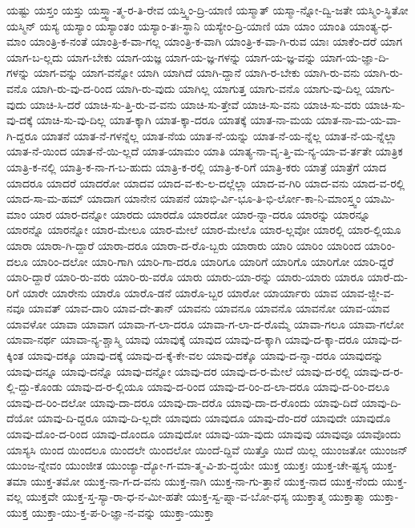{ಯಷ್ಟು
ಯಸ್ತಂ
ಯಸ್ತು
ಯಸ್ತ್ವಾ-ತ್ಮ-ರ-ತಿ-ರೇವ
ಯಸ್ತ್ವಿಂ-ದ್ರಿ-ಯಾಣಿ
ಯಸ್ಮಾತ್
ಯಸ್ಮಾ-ನ್ನೋ-ದ್ವಿ-ಜತೇ
ಯಸ್ಮಿಂ-ಸ್ಥಿತೋ
ಯಸ್ಮಿನ್
ಯಸ್ಯ
ಯಸ್ಯಾಂ
ಯಸ್ಯಾಂತಂ
ಯಸ್ಯಾಂ-ತಃ-ಸ್ಥಾನಿ
ಯಸ್ಯೇಂ-ದ್ರಿ-ಯಾಣಿ
ಯಾ
ಯಾಂ
ಯಾಂತಿ
ಯಾಂತ್ಯ-ಧ-ಮಾಂ
ಯಾಂತ್ರಿ-ಕ-ನಂತೆ
ಯಾಂತ್ರಿ-ಕ-ವಾ-ಗಲ್ಲ
ಯಾಂತ್ರಿ-ಕ-ವಾಗಿ
ಯಾಂತ್ರಿ-ಕ-ವಾ-ಗಿ-ರುವ
ಯಾಃ
ಯಾಕೆಂ-ದರೆ
ಯಾಗ
ಯಾಗ-ಬ-ಲ್ಲದು
ಯಾಗ-ಬೇಕು
ಯಾಗ-ಯಜ್ಞ
ಯಾಗ-ಯ-ಜ್ಞ-ಗಳನ್ನು
ಯಾಗ-ಯ-ಜ್ಞ-ವನ್ನು
ಯಾಗ-ಯ-ಜ್ಞಾ-ದಿ-ಗಳನ್ನು
ಯಾಗ-ವನ್ನು
ಯಾಗ-ವನ್ನೋ
ಯಾಗಿ
ಯಾಗಿದೆ
ಯಾಗಿ-ದ್ದಾನೆ
ಯಾಗಿ-ರ-ಬೇಕು
ಯಾಗಿ-ರು-ವನು
ಯಾಗಿ-ರು-ವನೊ
ಯಾಗಿ-ರು-ವು-ದ-ರಿಂದ
ಯಾಗಿ-ರು-ವುದು
ಯಾಗಿಲ್ಲ
ಯಾಗುತ್ತ
ಯಾಗು-ವನೊ
ಯಾಗು-ವು-ದಿಲ್ಲ
ಯಾಗು-ವುದು
ಯಾಚಿ-ಸಿ-ದರೆ
ಯಾಚಿ-ಸು-ತ್ತಿ-ರು-ವ-ವನು
ಯಾಚಿ-ಸು-ತ್ತೇವೆ
ಯಾಚಿ-ಸು-ವನು
ಯಾಚಿ-ಸು-ವರು
ಯಾಚಿ-ಸು-ವು-ದಕ್ಕೆ
ಯಾಚಿ-ಸು-ವು-ದಿಲ್ಲ
ಯಾತ-ಕ್ಕಾಗಿ
ಯಾತ-ಕ್ಕಾ-ದರೂ
ಯಾತಕ್ಕೆ
ಯಾತ-ನಾ-ಮಯ
ಯಾತ-ನಾ-ಮ-ಯ-ವಾ-ಗಿ-ದ್ದರೂ
ಯಾತನೆ
ಯಾತ-ನೆ-ಗಳನ್ನೆಲ್ಲ
ಯಾತ-ನೆಯ
ಯಾತ-ನೆ-ಯನ್ನು
ಯಾತ-ನೆ-ಯ-ನ್ನೆಲ್ಲ
ಯಾತ-ನೆ-ಯ-ನ್ನೆಲ್ಲಾ
ಯಾತ-ನೆ-ಯಿಂದ
ಯಾತ-ನೆ-ಯಿ-ಲ್ಲದೆ
ಯಾತ-ಯಾಮಂ
ಯಾತಿ
ಯಾತ್ಯ-ನಾ-ವೃ-ತ್ತಿ-ಮ-ನ್ಯ-ಯಾ-ವ-ರ್ತತೇ
ಯಾತ್ರಿಕ
ಯಾತ್ರಿ-ಕ-ನಲ್ಲಿ
ಯಾತ್ರಿ-ಕ-ನಾ-ಗ-ಬ-ಹುದು
ಯಾತ್ರಿ-ಕ-ರಲ್ಲಿ
ಯಾತ್ರಿ-ಕ-ರಿಗೆ
ಯಾತ್ರಿ-ಕರು
ಯಾತ್ರೆ
ಯಾತ್ರೆಗೆ
ಯಾದ
ಯಾದರೂ
ಯಾದರೆ
ಯಾದರೋ
ಯಾದವ
ಯಾದ-ವ-ಕು-ಲ-ದಲ್ಲೆಲ್ಲಾ
ಯಾದ-ವ-ಗಿರಿ
ಯಾದ-ವನು
ಯಾದ-ವ-ರಲ್ಲಿ
ಯಾದ-ಸಾ-ಮ-ಹಮ್
ಯಾದಾಗ
ಯಾನೇನ
ಯಾಪನೆ
ಯಾಭಿ-ರ್ವಿ-ಭೂ-ತಿ-ಭಿ-ರ್ಲೋ-ಕಾ-ನಿ-ಮಾಂಸ್ತ್ವಂ
ಯಾಮಿ-ಮಾಂ
ಯಾರ
ಯಾರ-ದನ್ನೋ
ಯಾರದು
ಯಾರದೊ
ಯಾರದೋ
ಯಾರ-ನ್ನಾ-ದರೂ
ಯಾರನ್ನು
ಯಾರನ್ನೂ
ಯಾರನ್ನೊ
ಯಾರನ್ನೋ
ಯಾರ-ಮೇಲೂ
ಯಾರ-ಮೇಲೆ
ಯಾರ-ಮೇಲೊ
ಯಾರ-ಲ್ಲವೋ
ಯಾರಲ್ಲಿ
ಯಾರ-ಲ್ಲಿಯೂ
ಯಾರಾ
ಯಾರಾ-ಗಿ-ದ್ದಾರೆ
ಯಾರಾ-ದರೂ
ಯಾರಾ-ದ-ರೊ-ಬ್ಬರು
ಯಾರಾರು
ಯಾರಿ
ಯಾರಿಂ
ಯಾರಿಂದ
ಯಾರಿಂ-ದಲೂ
ಯಾರಿಂ-ದಲೋ
ಯಾರಿ-ಗಾಗಿ
ಯಾರಿ-ಗಾ-ದರೂ
ಯಾರಿಗೂ
ಯಾರಿಗೆ
ಯಾರಿಗೊ
ಯಾರಿಗೋ
ಯಾರಿ-ದ್ದರೆ
ಯಾರಿ-ದ್ದಾರೆ
ಯಾರಿ-ರು-ವರು
ಯಾರಿ-ರು-ವರೊ
ಯಾರು
ಯಾರು-ಯಾ-ರನ್ನು
ಯಾರು-ಯಾರು
ಯಾರೂ
ಯಾರೆ-ದು-ರಿಗೆ
ಯಾರೇ
ಯಾರೇನು
ಯಾರೊ
ಯಾರೊ-ಡನೆ
ಯಾರೊ-ಬ್ಬರ
ಯಾರೋ
ಯಾರ್ಯಾರು
ಯಾವ
ಯಾವ-ಜ್ಜೀ-ವ-ನವೂ
ಯಾವತ್
ಯಾವ-ದಾರಿ
ಯಾವ-ದೇ-ತಾನ್
ಯಾವನು
ಯಾವನೂ
ಯಾವನೊ
ಯಾವನೋ
ಯಾವ-ಯಾವ
ಯಾವಳೋ
ಯಾವಾ
ಯಾವಾಗ
ಯಾವಾ-ಗ-ಲಾ-ದರೂ
ಯಾವಾ-ಗ-ಲಾ-ದ-ರೊಮ್ಮೆ
ಯಾವಾ-ಗಲೂ
ಯಾವಾ-ಗಲೋ
ಯಾವಾ-ನರ್ಥ
ಯಾವಾ-ನ್ಯ-ಶ್ಚಾಸ್ಮಿ
ಯಾವು
ಯಾವುಕ್ಕೆ
ಯಾವುದ
ಯಾವು-ದ-ಕ್ಕಾಗಿ
ಯಾವು-ದ-ಕ್ಕಾ-ದರೂ
ಯಾವು-ದ-ಕ್ಕಿಂತ
ಯಾವು-ದಕ್ಕೂ
ಯಾವು-ದಕ್ಕೆ
ಯಾವು-ದ-ಕ್ಕೆ-ಕೇ-ವಲ
ಯಾವು-ದಕ್ಕೊ
ಯಾವು-ದ-ನ್ನಾ-ದರೂ
ಯಾವುದನ್ನು
ಯಾವು-ದನ್ನೂ
ಯಾವು-ದನ್ನೊ
ಯಾವು-ದನ್ನೋ
ಯಾವು-ದರ
ಯಾವು-ದ-ರ-ಮೇಲೆ
ಯಾವು-ದ-ರಲ್ಲಿ
ಯಾವು-ದ-ರ-ಲ್ಲಿ-ದ್ದು-ಕೊಂಡು
ಯಾವು-ದ-ರ-ಲ್ಲಿಯೂ
ಯಾವು-ದ-ರಿಂದ
ಯಾವು-ದ-ರಿಂ-ದ-ಲಾ-ದರೂ
ಯಾವು-ದ-ರಿಂ-ದಲೂ
ಯಾವು-ದ-ರಿಂ-ದಲೋ
ಯಾವು-ದಾ-ದರೂ
ಯಾವು-ದಾ-ದರೊ
ಯಾವು-ದಾ-ದ-ರೊಂದು
ಯಾವು-ದಿದೆ
ಯಾವು-ದಿ-ದೆಯೋ
ಯಾವು-ದಿ-ದ್ದರೂ
ಯಾವು-ದಿ-ಲ್ಲದೇ
ಯಾವುದು
ಯಾವುದೂ
ಯಾವು-ದೆಂ-ದರೆ
ಯಾವುದೇ
ಯಾವುದೊ
ಯಾವು-ದೊಂ-ದ-ರಿಂದ
ಯಾವು-ದೊಂದೂ
ಯಾವುದೋ
ಯಾವು-ಯಾ-ವುದು
ಯಾವುವು
ಯಾವುವೂ
ಯಾವೊಂದು
ಯಾಸ್ಯಸಿ
ಯಿಂದ
ಯಿಂದಲೂ
ಯಿಂದಲೇ
ಯಿಂದಲೋ
ಯಿಂದೆ-ದ್ದಿವೆ
ಯಿತ್ತೊ
ಯಿದೆ
ಯಿಲ್ಲ
ಯುಂಜತೋ
ಯುಂಜನ್
ಯುಂಜ-ನ್ನೇವಂ
ಯುಂಜೀತ
ಯುಂಜ್ಯಾ-ದ್ಯೋ-ಗ-ಮಾ-ತ್ಮ-ವಿ-ಶು-ದ್ಧಯೇ
ಯುಕ್ತ
ಯುಕ್ತಃ
ಯುಕ್ತ-ಚೇ-ಷ್ಟಸ್ಯ
ಯುಕ್ತ-ತಮಾ
ಯುಕ್ತ-ತಮೋ
ಯುಕ್ತ-ನಾ-ಗ-ದ-ವನು
ಯುಕ್ತ-ನಾಗಿ
ಯುಕ್ತ-ನಾ-ಗು-ತ್ತಾನೆ
ಯುಕ್ತ-ನಾದ
ಯುಕ್ತ-ನೆಂದು
ಯುಕ್ತ-ವಲ್ಲ
ಯುಕ್ತವೇ
ಯುಕ್ತ-ಸ್ತ-ಸ್ಯಾ-ರಾ-ಧ-ನ-ಮೀ-ಹತೇ
ಯುಕ್ತ-ಸ್ವ-ಪ್ನಾ-ವ-ಬೋ-ಧಸ್ಯ
ಯುಕ್ತಾತ್ಮ
ಯುಕ್ತಾತ್ಮಾ
ಯುಕ್ತಾ-ಯುಕ್ತ
ಯುಕ್ತಾ-ಯು-ಕ್ತ-ಪ-ರಿ-ಜ್ಞಾ-ನ-ವನ್ನು
ಯುಕ್ತಾ-ಯುಕ್ತಾ
}

